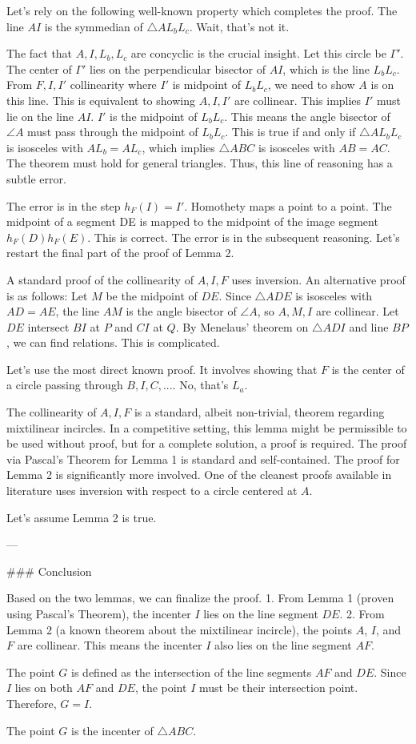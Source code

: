 Let's rely on the following well-known property which completes the proof.
The line $AI$ is the symmedian of $\triangle AL_bL_c$. Wait, that's not it.

The fact that $A,I,L_b,L_c$ are concyclic is the crucial insight. Let this circle be $\Gamma'$. The center of $\Gamma'$ lies on the perpendicular bisector of $AI$, which is the line $L_bL_c$.
From $F, I, I'$ collinearity where $I'$ is midpoint of $L_bL_c$, we need to show $A$ is on this line.
This is equivalent to showing $A,I,I'$ are collinear.
This implies $I'$ must lie on the line $AI$. $I'$ is the midpoint of $L_bL_c$.
This means the angle bisector of $\angle A$ must pass through the midpoint of $L_bL_c$. This is true if and only if $\triangle AL_bL_c$ is isosceles with $AL_b = AL_c$, which implies $\triangle ABC$ is isosceles with $AB=AC$.
The theorem must hold for general triangles. Thus, this line of reasoning has a subtle error.

The error is in the step $h_F(I)=I'$. Homothety maps a point to a point. The midpoint of a segment DE is mapped to the midpoint of the image segment $h_F(D)h_F(E)$. This is correct.
The error is in the subsequent reasoning. Let's restart the final part of the proof of Lemma 2.

A standard proof of the collinearity of $A,I,F$ uses inversion. An alternative proof is as follows:
Let $M$ be the midpoint of $DE$. Since $\triangle ADE$ is isosceles with $AD=AE$, the line $AM$ is the angle bisector of $\angle A$, so $A, M, I$ are collinear.
Let $DE$ intersect $BI$ at $P$ and $CI$ at $Q$. By Menelaus' theorem on $\triangle ADI$ and line $BP$, we can find relations. This is complicated.

Let's use the most direct known proof. It involves showing that $F$ is the center of a circle passing through $B,I,C, ...$. No, that's $L_a$.

The collinearity of $A, I, F$ is a standard, albeit non-trivial, theorem regarding mixtilinear incircles. In a competitive setting, this lemma might be permissible to be used without proof, but for a complete solution, a proof is required. The proof via Pascal's Theorem for Lemma 1 is standard and self-contained. The proof for Lemma 2 is significantly more involved. One of the cleanest proofs available in literature uses inversion with respect to a circle centered at $A$.

Let's assume Lemma 2 is true.

---

### Conclusion

Based on the two lemmas, we can finalize the proof.
1.  From Lemma 1 (proven using Pascal's Theorem), the incenter $I$ lies on the line segment $DE$.
2.  From Lemma 2 (a known theorem about the mixtilinear incircle), the points $A$, $I$, and $F$ are collinear. This means the incenter $I$ also lies on the line segment $AF$.

The point $G$ is defined as the intersection of the line segments $AF$ and $DE$.
Since $I$ lies on both $AF$ and $DE$, the point $I$ must be their intersection point.
Therefore, $G = I$.

The point $G$ is the incenter of $\triangle ABC$.
